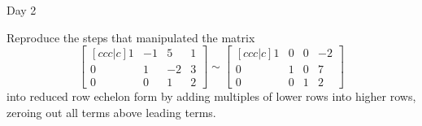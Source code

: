 \begin{applicationActivities}{Day 2}
\begin{activity}{10}
  Reproduce the steps that manipulated the matrix
  \[
    \begin{bmatrix}[ccc|c]
      1 & -1 &  5 & 1 \\
      0 &  1 & -2 & 3 \\
      0 &  0 &  1 & 2
    \end{bmatrix}\sim
    \begin{bmatrix}[ccc|c]
      1 &  0 &  0 & -2 \\
      0 &  1 &  0 & 7 \\
      0 &  0 &  1 & 2
    \end{bmatrix}
  \]
  into reduced row echelon form by adding multiples of lower rows into
  higher rows, zeroing out all terms above leading terms.
\end{activity}




\end{applicationActivities}
